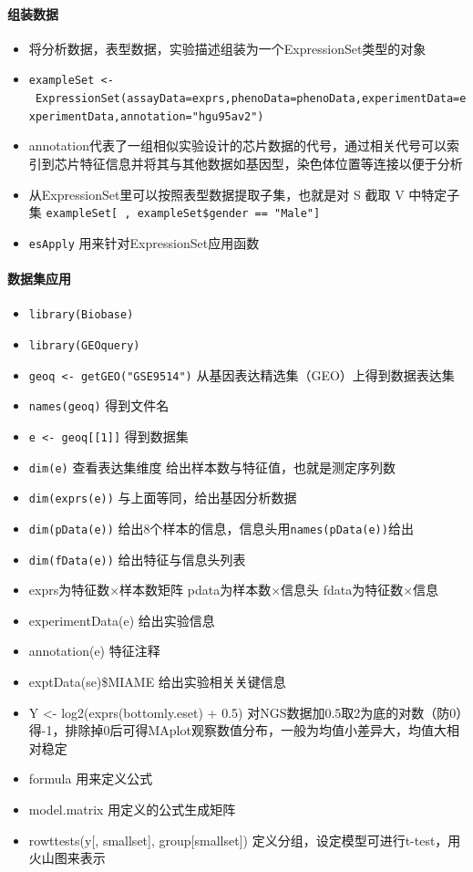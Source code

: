 \documentclass[]{book}
\providecommand{\tightlist}{%
  \setlength{\itemsep}{0pt}\setlength{\parskip}{0pt}}
\let\oldparagraph\paragraph
\renewcommand{\paragraph}[1]{\oldparagraph{#1}\mbox{}}
\begin{document}
\paragraph{组装数据}

\begin{itemize}
\tightlist
\item
  将分析数据，表型数据，实验描述组装为一个ExpressionSet类型的对象
\item
  \texttt{exampleSet\ \textless{}-\ ExpressionSet(assayData=exprs,phenoData=phenoData,experimentData=experimentData,annotation="hgu95av2")}
\item
  annotation代表了一组相似实验设计的芯片数据的代号，通过相关代号可以索引到芯片特征信息并将其与其他数据如基因型，染色体位置等连接以便于分析
\item
  从ExpressionSet里可以按照表型数据提取子集，也就是对 S 截取 V 中特定子集 \texttt{exampleSet{[}\ ,\ exampleSet\$gender\ ==\ "Male"{]}}
\item
  \texttt{esApply} 用来针对ExpressionSet应用函数
\end{itemize}

\paragraph{数据集应用}

\begin{itemize}
\tightlist
\item
  \texttt{library(Biobase)}
\item
  \texttt{library(GEOquery)}
\item
  \texttt{geoq\ \textless{}-\ getGEO("GSE9514")} 从基因表达精选集（GEO）上得到数据表达集
\item
  \texttt{names(geoq)} 得到文件名
\item
  \texttt{e\ \textless{}-\ geoq{[}{[}1{]}{]}} 得到数据集
\item
  \texttt{dim(e)} 查看表达集维度 给出样本数与特征值，也就是测定序列数
\item
  \texttt{dim(exprs(e))} 与上面等同，给出基因分析数据
\item
  \texttt{dim(pData(e))} 给出8个样本的信息，信息头用\texttt{names(pData(e))}给出
\item
  \texttt{dim(fData(e))} 给出特征与信息头列表
\item
  exprs为特征数×样本数矩阵 pdata为样本数×信息头 fdata为特征数×信息
\item
  experimentData(e) 给出实验信息
\item
  annotation(e) 特征注释
\item
  exptData(se)\$MIAME 给出实验相关关键信息
\item
  Y \textless{}- log2(exprs(bottomly.eset) + 0.5) 对NGS数据加0.5取2为底的对数（防0）得-1，排除掉0后可得MAplot观察数值分布，一般为均值小差异大，均值大相对稳定
\item
  formula 用来定义公式
\item
  model.matrix 用定义的公式生成矩阵
\item
  rowttests(y{[}, smallset{]}, group{[}smallset{]}) 定义分组，设定模型可进行t-test，用火山图来表示
\end{itemize}
\end{document}
